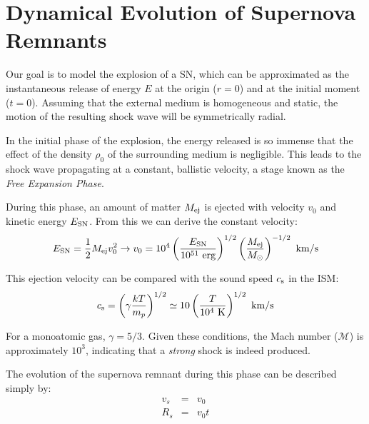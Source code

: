 
\section{Dynamical Evolution of Supernova Remnants}

Our goal is to model the explosion of a SN, which can be approximated as the instantaneous release of energy \( E \) at the origin (\( r = 0 \)) and at the initial moment (\( t = 0 \)). Assuming that the external medium is homogeneous and static, the motion of the resulting shock wave will be symmetrically radial.

In the initial phase of the explosion, the energy released is so immense that the effect of the density \( \rho_0 \) of the surrounding medium is negligible. 
%
This leads to the shock wave propagating at a constant, ballistic velocity, a stage known as the \emph{Free Expansion Phase}.

During this phase, an amount of matter \( M_{\rm ej} \) is ejected with velocity \( v_0 \) and kinetic energy \( E_{\rm SN} \). From this we can derive the constant velocity:
%
\[
E_{\rm SN} = \frac{1}{2} M_{\rm ej} v_0^2 \rightarrow v_0 = 10^4 \left( \frac{E_{\rm SN}}{10^{51}~\text{erg}} \right)^{1/2} \left( \frac{M_{\rm ej}}{M_\odot} \right)^{-1/2}~\text{km/s}
\]

This ejection velocity can be compared with the sound speed \( c_{\rm s} \) in the ISM:
%
\[
c_{\rm s} = \left( \gamma \frac{k T}{m_p} \right)^{1/2} \simeq 10 \left( \frac{T}{10^4~\text{K}} \right)^{1/2}~\text{km/s}
\]

For a monoatomic gas, \( \gamma = 5/3 \). Given these conditions, the Mach number (\( \mathcal M \)) is approximately \( 10^3 \), indicating that a \emph{strong} shock is indeed produced.

The evolution of the supernova remnant during this phase can be described simply by:
%
\begin{eqnarray*}
v_s & =  & v_0 \\
R_s & = & v_0 t 
\end{eqnarray*}

